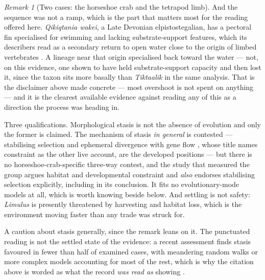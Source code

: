 \documentclass[11pt,a4paper]{article}
\theoremstyle{remark}
\newtheorem{remark}[definition]{Remark}
\begin{document}
\begin{remark}[Two cases: the horseshoe crab and the tetrapod limb]
And the sequence was not a ramp, which is the part that matters most for the reading offered here. \emph{Qikiqtania wakei}, a Late Devonian elpistostegalian, has a pectoral fin specialised for swimming
and lacking substrate-support features, which its describers read as a secondary return to open water
close to the origin of limbed vertebrates \citep{stewart2022}. A lineage near that origin specialised
back toward the water --- not, on this evidence, one shown to have held substrate-support capacity
and then lost it, since the taxon sits more basally than \emph{Tiktaalik} in the same analysis. That is the
disclaimer above made concrete --- most overshoot is not spent on anything --- and it is the clearest
available evidence against reading any of this as a direction the process was heading in.

Three qualifications. Morphological stasis is not the absence of evolution and only the former is
claimed. The mechanism of stasis \emph{in general} is contested --- stabilising selection
\citep{estesarnold2007} and ephemeral divergence with gene flow \citep{futuyma2010}, whose title names
constraint as the other live account, are the developed positions --- but there is no horseshoe-crab-specific three-way contest, and the study that measured the group argues habitat and developmental constraint and
\emph{also} endorses stabilising selection explicitly, including in its conclusion. It fits no
evolutionary-mode models at all, which is worth knowing beside \citet{hunt2025} below. And settling is not safety: \emph{Limulus} is presently threatened by harvesting and
habitat loss, which is the environment moving faster than any trade was struck for.

A caution about stasis generally, since the remark leans on it. The punctuated reading is not the
settled state of the evidence: a recent assessment finds stasis favoured in fewer than half of
examined cases, with meandering random walks or more complex models accounting for most of the rest, which is why the
citation above is worded as what the record \emph{was read as} showing \citep{hunt2025}.
\end{remark}
\end{document}
